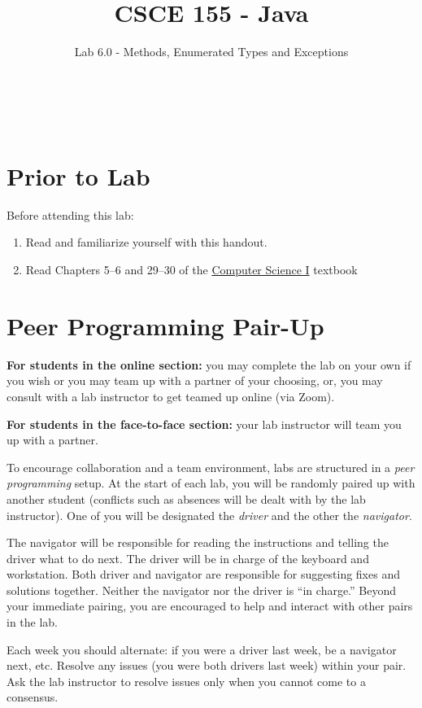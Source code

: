 \documentclass[12pt]{scrartcl}
\title{CSCE 155 - Java}
\subtitle{Lab 6.0 - Methods, Enumerated Types and Exceptions}
\author{~}
\date{~}
\begin{document}
\maketitle

\section*{Prior to Lab}

Before attending this lab:
\begin{enumerate}
  \item Read and familiarize yourself with this handout.
  \item Read Chapters 5--6 and 29--30 of the \href{http://cse.unl.edu/~cbourke/ComputerScienceOne.pdf}{Computer Science I} textbook
\end{enumerate}

\section*{Peer Programming Pair-Up}

\textbf{For students in the online section:} you may complete
the lab on your own if you wish or you may team up with a partner
of your choosing, or, you may consult with a lab instructor to get
teamed up online (via Zoom).

\textbf{For students in the face-to-face section:} your
lab instructor will team you up with a partner.  

To encourage collaboration and a team environment, labs are
structured in a \emph{peer programming} setup.  At the start of
each lab, you will be randomly paired up with another student 
(conflicts such as absences will be dealt with by the lab instructor).
One of you will be designated the \emph{driver} and the other
the \emph{navigator}.  

The navigator will be responsible for reading the instructions and
telling the driver what to do next.  The driver will be in charge of the
keyboard and workstation.  Both driver and navigator are responsible
for suggesting fixes and solutions together.  Neither the navigator
nor the driver is ``in charge.''  Beyond your immediate pairing, you
are encouraged to help and interact with other pairs in the lab.

Each week you should alternate: if you were a driver last week, 
be a navigator next, etc.  Resolve any issues (you were both drivers
last week) within your pair.  Ask the lab instructor to resolve issues
only when you cannot come to a consensus.  
\end{document}
